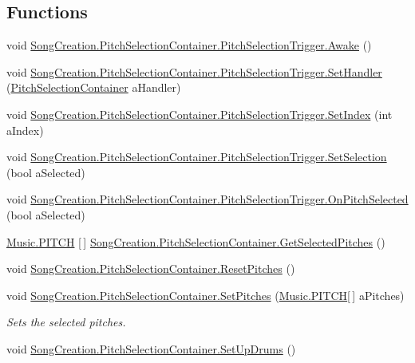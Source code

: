 \subsection*{Functions}
\begin{DoxyCompactItemize}
\item 
void \hyperlink{group___s_c_handlers_gae07e3c0a5aa45a8b064abb9cea88c1d6}{Song\+Creation.\+Pitch\+Selection\+Container.\+Pitch\+Selection\+Trigger.\+Awake} ()
\item 
void \hyperlink{group___s_c_handlers_ga963bc1a13bdd44643cf814aa4976f3d0}{Song\+Creation.\+Pitch\+Selection\+Container.\+Pitch\+Selection\+Trigger.\+Set\+Handler} (\hyperlink{class_song_creation_1_1_pitch_selection_container}{Pitch\+Selection\+Container} a\+Handler)
\item 
void \hyperlink{group___s_c_handlers_ga1f01d4d64cc4697b0c403c007a014afa}{Song\+Creation.\+Pitch\+Selection\+Container.\+Pitch\+Selection\+Trigger.\+Set\+Index} (int a\+Index)
\item 
void \hyperlink{group___s_c_handlers_ga0eebfa085bd5326ed4cb4981cf02d2e0}{Song\+Creation.\+Pitch\+Selection\+Container.\+Pitch\+Selection\+Trigger.\+Set\+Selection} (bool a\+Selected)
\item 
void \hyperlink{group___s_c_handlers_gac113e02950a228fc6c78ad5972238a98}{Song\+Creation.\+Pitch\+Selection\+Container.\+Pitch\+Selection\+Trigger.\+On\+Pitch\+Selected} (bool a\+Selected)
\item 
\hyperlink{group___music_enums_ga508f69b199ea518f935486c990edac1d}{Music.\+P\+I\+T\+CH} \mbox{[}$\,$\mbox{]} \hyperlink{group___s_c_handlers_gac7a3634aba275f03dffe9f45e444dbf1}{Song\+Creation.\+Pitch\+Selection\+Container.\+Get\+Selected\+Pitches} ()
\item 
void \hyperlink{group___s_c_handlers_ga9dc0b40102f1fb0e50fdf07ca7b31d96}{Song\+Creation.\+Pitch\+Selection\+Container.\+Reset\+Pitches} ()
\item 
void \hyperlink{group___s_c_handlers_ga906474015828cf26182e1f06f7094e00}{Song\+Creation.\+Pitch\+Selection\+Container.\+Set\+Pitches} (\hyperlink{group___music_enums_ga508f69b199ea518f935486c990edac1d}{Music.\+P\+I\+T\+CH}\mbox{[}$\,$\mbox{]} a\+Pitches)
\begin{DoxyCompactList}\small\item\em Sets the selected pitches. \end{DoxyCompactList}\item 
void \hyperlink{group___s_c_handlers_gae0bda65460aedf8384cd51bd6079d85b}{Song\+Creation.\+Pitch\+Selection\+Container.\+Set\+Up\+Drums} ()

\end{DoxyCompactItemize}
